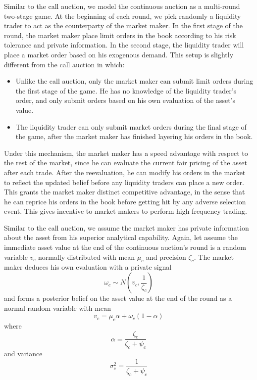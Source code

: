 \documentclass{article}
\begin{document}
Similar to the call auction, we model the continuous auction as a multi-round two-stage game. At the beginning of each round, we pick randomly a liquidity trader to act as the counterparty of the market maker. In the first stage of the round, the market maker place limit orders in the book according to his risk tolerance and private information. In the second stage, the liquidity trader will place a market order based on his exogenous demand. This setup is slightly different from the call auction in which:
\begin{itemize}
  \item Unlike the call auction, only the market maker can submit limit orders during the first stage of the game. He has no knowledge of the liquidity trader's order, and only submit orders based on his own evaluation of the asset's value.
  \item The liquidity trader can only submit market orders during the final stage of the game, after the market maker has finished layering his orders in the book.
\end{itemize}
Under this mechanism, the market maker has a speed advantage with respect to the rest of the market, since he can evaluate the current fair pricing of the asset after each trade. After the reevaluation, he can modify his orders in the market to reflect the updated belief before any liquidity traders can place a new order. This grants the market maker distinct competitive advantage, in the sense that he can reprice his orders in the book before getting hit by any adverse selection event. This gives incentive to market makers to perform high frequency trading.

Similar to the call auction, we assume the market maker has private information about the asset from his superior analytical capability. Again, let assume the immediate asset value at the end of the continuous auction's round is a random variable $v_c$ normally distributed with mean $\mu_c$ and precision $\zeta_c$. The market maker deduces his own evaluation with a private signal
\[
  \omega_c \sim N(v_c, \frac{1}{\zeta_c})
\]
and forms a posterior belief on the asset value at the end of the round as a normal random variable with mean
\[
  v_c=\mu_c \alpha + \omega_c(1 - \alpha)
\]
where
\[
  \alpha = \frac{\zeta_c}{\zeta_c+\psi_c}
\]
and variance
\[
  \sigma_c^2=\frac{1}{\zeta_c+\psi_c}
\]
\end{document}
